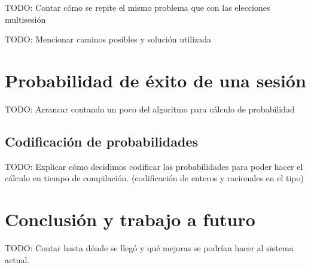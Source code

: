 \begin{frame}{\insertsubsection}
	TODO: Contar cómo se repite el mismo problema que con las elecciones multisesión
\end{frame}

\begin{frame}{\insertsubsection}
	TODO: Mencionar caminos posibles y solución utilizada
\end{frame}

\section{Probabilidad de éxito de una sesión}
\begin{frame}{\insertsection}
	TODO: Arrancar contando un poco del algoritmo para cálculo de probabilidad
\end{frame}

\subsection{Codificación de probabilidades}
\begin{frame}{\insertsubsection}
	TODO: Explicar cómo decidimos codificar las probabilidades para poder hacer el cálculo en tiempo de compilación. (codificación de enteros y racionales en el tipo)
\end{frame}

\section{Conclusión y trabajo a futuro}
\begin{frame}{\insertsection}
	TODO: Contar hasta dónde se llegó y qué mejoras se podrían hacer al sistema actual.
\end{frame}
